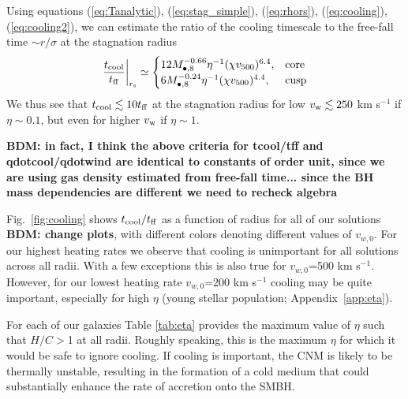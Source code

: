 \documentclass[usenatbib,fleqn]{mn2e}
\newcommand\lsim{\mathrel{\rlap{\lower4pt\hbox{\hskip1pt$\sim$}}
    \raise1pt\hbox{$<$}}}
\newcommand\gsim{\mathrel{\rlap{\lower4pt\hbox{\hskip1pt$\sim$}}
    \raise1pt\hbox{$>$}}}
\newcommand{\Mbheight}{M_{\bullet,8}}
\newcommand{\vwO}{v_{w,0}}
\begin{document}
Using equations (\ref{eq:Tanalytic}), (\ref{eq:stag_simple}), (\ref{eq:rhors}), (\ref{eq:cooling}), (\ref{eq:cooling2}), we can estimate the ratio of the cooling timescale to the free-fall time $\sim r/\sigma$ at the stagnation radius
\begin{align}
  \left.\frac{t_{\rm cool}}{t_{\rm ff}}\right|_{r_{\rm s}}\simeq
  \begin{cases}
    12 \Mbheight^{-0.66} \eta^{-1}(\chi v_{500})^{6.4}, & \text{core}\\
    6  \Mbheight^{-0.24} \eta^{-1}(\chi v_{500})^{4.4} ,   & \text{cusp}
  \end{cases}
  \label{eq:coolingratio}
\end{align}
We thus see that $t_{\rm cool} \lesssim 10 t_{\rm ff}$ at the stagnation radius for low $v_{\rm w} \lesssim 250$ km s$^{-1}$ if $\eta \sim 0.1$, but even for higher $v_{\rm w}$ if $\eta \sim 1$.    

{\bf BDM: in fact, I think the above criteria for tcool/tff and qdotcool/qdotwind are identical to constants of order unit, since we are using gas density estimated from free-fall time... since the BH mass dependencies are different we need to recheck algebra}

Fig.~\ref{fig:cooling} shows $t_{\rm cool}/t_{\rm ff}$ as a function of radius for all of our solutions {\bf BDM: change plots}, with different colors denoting different values of $v_{w,0}$.  For our highest heating rates we observe that cooling is unimportant for all solutions across all radii.  With a few exceptions this is also true for $\vwO$=500 km s$^{-1}$.  However, for our lowest heating rate $\vwO$=200 km s$^{-1}$ cooling may be quite important, especially for high $\eta$ (young stellar population;  Appendix~\ref{app:eta}).  

For each of our galaxies Table \ref{tab:eta} provides the maximum value of $\eta$ such that $H/C >$1 at all radii.  Roughly speaking, this is the maximum $\eta$ for which it would be safe to ignore cooling.  If cooling is important, the CNM is likely to be thermally unstable, resulting in the formation of a cold medium that could substantially enhance the rate of accretion onto the SMBH.  

\end{document}
